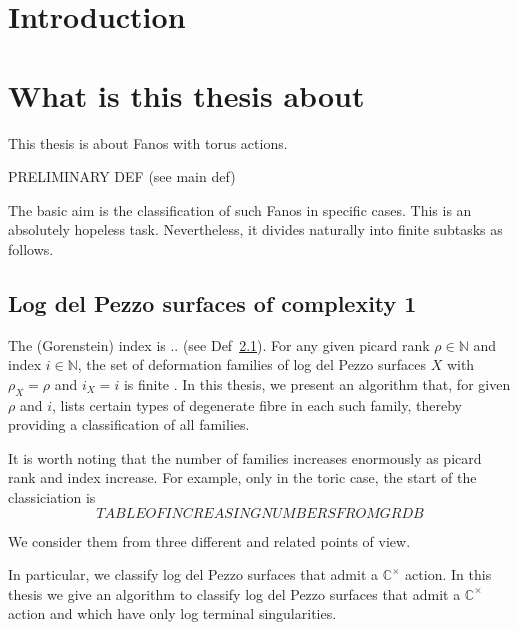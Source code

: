 \documentclass[12pt,a4paper]{book}      %
\newcommand{\N}{\mathbb{N}}
\begin{document}
%  
%  
\newpage

\section{Introduction}

\section{What is this thesis about}

This thesis is about Fanos with torus actions.

PRELIMINARY DEF (see main def)

The basic aim is the classification of such Fanos in specific cases.
This is an absolutely hopeless task.
Nevertheless, it divides naturally into finite subtasks as follows.

\subsection{Log del Pezzo surfaces of complexity 1}
The (Gorenstein) index is .. (see Def~\ref{}).
For any given picard rank $\rho\in\N$ and index $i\in\N$, the set of deformation
families of log del Pezzo surfaces $X$ with $\rho_X=\rho$ and $i_X=i$
is finite \cite{}.
In this thesis, we present an algorithm that, for given $\rho$ and $i$,
lists certain types of degenerate fibre in each such family, thereby
providing a classification of all families.

It is worth noting that the number of families increases enormously as
picard rank and index increase. For example, only in the toric case, 
the start of the classiciation is
\[
TABLE OF INCREASING NUMBERS FROM GRDB
\]

We consider them from three different and related points of view.

In particular, we classify log del Pezzo surfaces that admit a $\mathbb{C}^\times$ action.
In this thesis we give an algorithm to classify log del Pezzo surfaces that admit a $\mathbb{C}^\times$ action and which have only log terminal singularities. 
\end{document}
